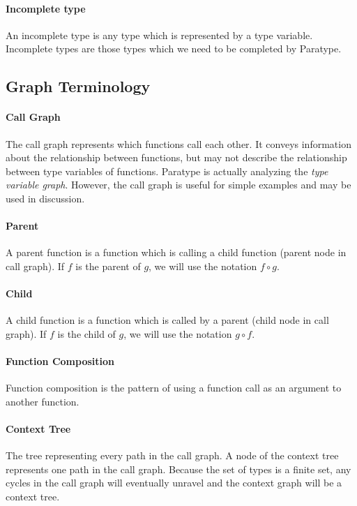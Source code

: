 \documentclass[10pt]{article}
\begin{document}
	\paragraph{Incomplete type}
	An incomplete type is any type which is represented by a type variable.
	Incomplete types are those types which we need to be completed by Paratype.
	
	
\subsection{Graph Terminology}
	\paragraph{Call Graph}
	The call graph represents which functions call each other. It conveys
	information about the relationship between functions, but may not describe
	the relationship between type variables of functions. Paratype is actually
	analyzing the \emph{type variable graph}. However, the call graph is useful
	for simple examples and may be used in discussion.
	
	\paragraph{Parent}
	A parent function is a function which is calling a child function (parent
	node in call graph). If $f$ is the parent of $g$, we will use the notation
	$f \circ g$.
	
	\paragraph{Child}
	A child function is a function which is called by a parent (child node in
	call graph). If $f$ is the child of $g$, we will use the notation $g \circ
	f$.
	
	\paragraph{Function Composition}
	Function composition is the pattern of using a function call as an argument
	to another function.
	
	\paragraph{Context Tree}
	The tree representing every path in the call graph. A node of the context
	tree represents one path in the call graph. Because the set of types is a
	finite set, any cycles in the call graph will eventually unravel and the
	context graph will be a context tree.
	
\end{document}
